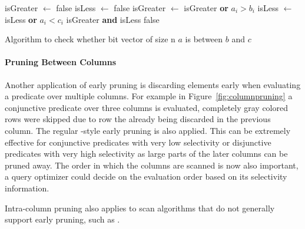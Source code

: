 \begin{algorithm}[h]
\begin{algorithmic}[1]
    \State isGreater $\gets$ false
    \State isLess $\gets$ false
      \State isGreater $\gets$ isGreater \textbf{or} $a_i > b_i$
      \State isLess $\gets$ isLess \textbf{or} $a_i < c_i$
        \State \Return isGreater \textbf{and} isLess
      \EndIf
    \EndFor
    \State \Return false
  \EndProcedure
\end{algorithmic}
\caption{Algorithm to check whether bit vector of size n $a$ is between $b$ and $c$}
\label{algo:between}
\end{algorithm}

\paragraph{Pruning Between Columns}

Another application of early pruning is discarding elements early when
evaluating a predicate over multiple columns. For example in
Figure~\ref{fig:columnpruning} a conjunctive predicate over three columns is
evaluated, completely gray colored rows were skipped due to row the already being
discarded in the previous column. The regular \bwv{}-style early pruning is
also applied. This can be extremely effective for conjunctive predicates with
very low selectivity or disjunctive predicates with very high selectivity as
large parts of the later columns can be pruned away.  The order in which the
columns are scanned is now also important, a query optimizer could decide on the
evaluation order based on its selectivity information.

Intra-column pruning also applies to scan algorithms that do not generally
support early pruning, such as \simdscan{}.

